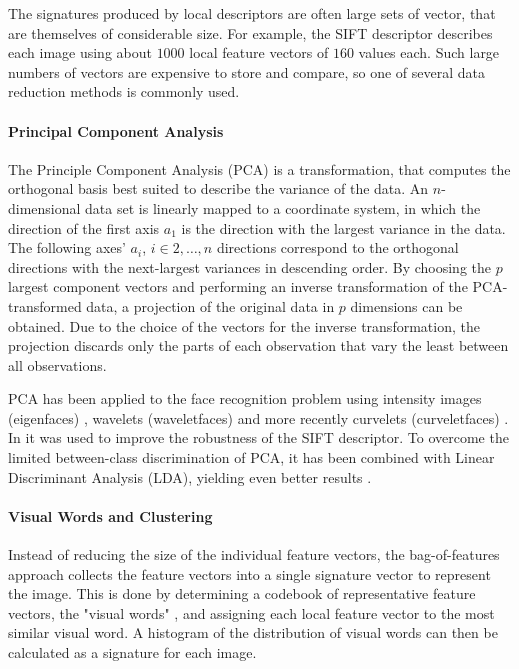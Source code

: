 The signatures produced by local descriptors are often large sets of vector,
that are themselves of considerable size. For example, the SIFT descriptor
describes each image using about $1000$ local feature vectors of $160$ values
each. Such large numbers of vectors are expensive to store and compare, so one
of several data reduction methods is commonly used.

\paragraph{Principal Component Analysis}

The Principle Component Analysis (PCA) is a transformation, that computes the
orthogonal basis best suited to describe the variance of the data. An
$n$-dimensional data set is linearly mapped to a coordinate system, in which
the direction of the first axis $a_1$ is the direction with the largest
variance in the data. The following axes' $a_i$, $i \in 2, \dots, n$ directions
correspond to the orthogonal directions with the next-largest variances in
descending order. By choosing the $p$ largest component vectors and performing
an inverse transformation of the PCA-transformed data, a projection of the
original data in $p$ dimensions can be obtained. Due to the choice of the
vectors for the inverse transformation, the projection discards only the parts
of each observation that vary the least between all observations.

PCA has been applied to the face recognition problem using intensity images
(eigenfaces) \autocite{turk_face_1991}, wavelets (waveletfaces)
\autocite{feng_human_2000} and more recently curvelets (curveletfaces)
\autocite{mandal_face_2008}. In \autocite{ke_pca-sift:_2004} it was used to
improve the robustness of the SIFT \autocite{lowe_object_1999} descriptor. To
overcome the limited between-class discrimination of PCA, it has been combined
with Linear Discriminant Analysis (LDA), yielding even better results
\autocite{mandal_curvelet_2009}.

\paragraph{Visual Words and Clustering}

Instead of reducing the size of the individual feature vectors, the
bag-of-features approach collects the feature vectors into a single signature
vector to represent the image. This is done by determining a codebook of
representative feature vectors, the "visual words" \autocite{sivic_video_2003},
and assigning each local feature vector to the most similar visual word. A
histogram of the distribution of visual words can then be calculated as a
signature for each image.

